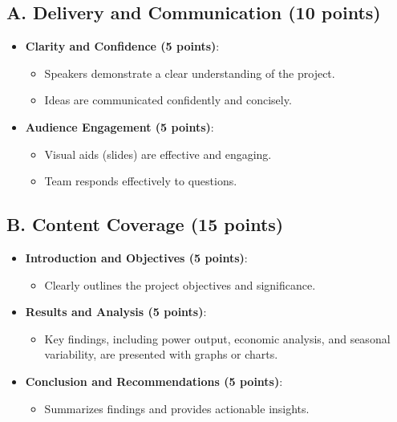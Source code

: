 \documentclass[11pt]{article}
\begin{document}
\subsection*{A. Delivery and Communication (10 points)}
\begin{itemize}
    \item \textbf{Clarity and Confidence (5 points)}:
    \begin{itemize}
        \item Speakers demonstrate a clear understanding of the project.
        \item Ideas are communicated confidently and concisely.
    \end{itemize}
    \item \textbf{Audience Engagement (5 points)}:
    \begin{itemize}
        \item Visual aids (slides) are effective and engaging.
        \item Team responds effectively to questions.
    \end{itemize}
\end{itemize}

\subsection*{B. Content Coverage (15 points)}
\begin{itemize}
    \item \textbf{Introduction and Objectives (5 points)}:
    \begin{itemize}
        \item Clearly outlines the project objectives and significance.
    \end{itemize}
    \item \textbf{Results and Analysis (5 points)}:
    \begin{itemize}
        \item Key findings, including power output, economic analysis, and seasonal variability, are presented with graphs or charts.
    \end{itemize}
    \item \textbf{Conclusion and Recommendations (5 points)}:
    \begin{itemize}
        \item Summarizes findings and provides actionable insights.
    \end{itemize}
\end{itemize}
\end{document}
